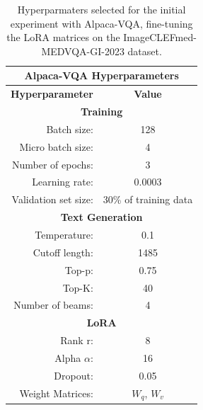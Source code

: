    \begin{table}[htb]
    \centering
    \begin{tabular}{ r r c } 
         \multicolumn{3}{c}{\textbf{Alpaca-VQA Hyperparameters}}\\
        \toprule
           \multicolumn{2}{c}{\textbf{Hyperparameter}} & \textbf{Value}\\ 
        \midrule
            \multicolumn{3}{c}{\textbf{Training}}\\
            
            \multicolumn{2}{r}{Batch size:} & 128 \\
            \multicolumn{2}{r}{Micro batch size:} & 4 \\
            \multicolumn{2}{r}{Number of epochs:}& 3 \\
            \multicolumn{2}{r}{Learning rate:} & 0.0003 \\ 
            \multicolumn{2}{r}{Validation set size:} & 30\% of training data\\
        \midrule
            \multicolumn{3}{c}{\textbf{Text Generation}}\\
            \multicolumn{2}{r}{Temperature:} & 0.1\\
             \multicolumn{2}{r}{Cutoff length:} & 1485 \\
            \multicolumn{2}{r}{Top-p:} & 0.75\\
            \multicolumn{2}{r}{Top-K:} & 40\\
            \multicolumn{2}{r}{Number of beams:} & 4\\
        \midrule
            \multicolumn{3}{c}{\textbf{LoRA}}\\
            \multicolumn{2}{r}{Rank r:} & 8 \\
            \multicolumn{2}{r}{Alpha $\alpha$:} & 16 \\
            \multicolumn{2}{r}{Dropout:} & 0.05 \\
            \multicolumn{2}{r}{Weight Matrices:} & $W_q$, $W_v$ \\[0.5ex]
        \bottomrule
    \end{tabular}
    \caption{Hyperparmaters selected for the initial experiment with Alpaca-VQA, fine-tuning the LoRA matrices on the ImageCLEFmed-MEDVQA-GI-2023 dataset.}
    \label{table:hyperparameters_alpaca}
    \end{table}


